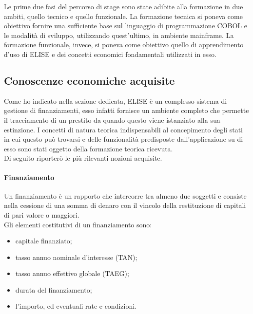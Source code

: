 Le prime due fasi del percorso di stage sono state adibite alla formazione in due ambiti, quello tecnico e quello funzionale. La formazione tecnica si poneva come obiettivo fornire una sufficiente base sul linguaggio di programmazione COBOL e le modalità di sviluppo, utilizzando quest'ultimo, in ambiente mainframe. La formazione funzionale, invece, si poneva come obiettivo quello di apprendimento d'uso di ELISE e dei concetti economici fondamentali utilizzati in esso.

\subsection{Conoscenze economiche acquisite}

Come ho indicato nella sezione dedicata, ELISE è un complesso sistema di gestione di finanziamenti, esso infatti fornisce un ambiente completo che permette il tracciamento di un prestito da quando questo viene istanziato alla sua estinzione. I concetti di natura teorica indispensabili al concepimento degli stati in cui questo può trovarsi e delle funzionalità predisposte dall'applicazione su di esso sono stati oggetto della formazione teorica ricevuta.\\

Di seguito riporterò le più rilevanti nozioni acquisite.

\paragraph{Finanziamento}
Un finanziamento è un rapporto che intercorre tra almeno due soggetti e consiste nella cessione di una somma di denaro con il vincolo della restituzione di capitali di pari valore o maggiori.\\
Gli elementi costitutivi di un finanziamento sono:
	\begin{itemize}
		\item capitale finanziato;
		\item tasso annuo nominale d'interesse (TAN);
		\item tasso annuo effettivo globale (TAEG);
		\item durata del finanziamento;
		\item l'importo, ed eventuali rate e condizioni.	
	\end{itemize}


